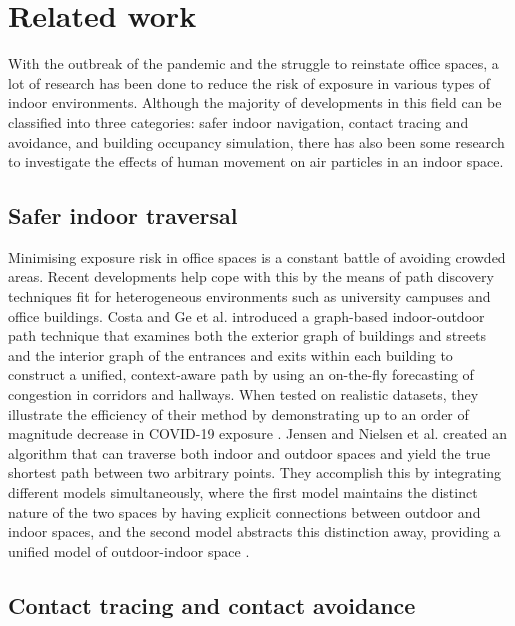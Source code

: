 \documentclass[acmtog]{acmart}
\begin{document}


\section{Related work}
With the outbreak of the pandemic and the struggle to reinstate office spaces, a lot of research has been done to reduce the risk of exposure in various types of indoor environments. Although the majority of developments in this field can be classified into three categories: safer indoor navigation, contact tracing and avoidance, and building occupancy simulation, there has also been some research to investigate the effects of human movement on air particles in an indoor space.

\subsection{Safer indoor traversal}

Minimising exposure risk in office spaces is a constant battle of avoiding crowded areas. Recent developments help cope with this by the means of path discovery techniques fit for heterogeneous environments such as university campuses and office buildings. Costa and Ge et al. introduced a graph-based indoor-outdoor path technique that examines both the exterior graph of buildings and streets and the interior graph of the entrances and exits within each building to construct a unified, context-aware path by using an on-the-fly forecasting of congestion in corridors and hallways. When tested on realistic datasets, they illustrate the efficiency of their method by demonstrating up to an order of magnitude decrease in COVID-19 exposure \cite{costa2019caprio}. Jensen and Nielsen et al. created an algorithm that can traverse both indoor and outdoor spaces and yield the true shortest path between two arbitrary points. They accomplish this by integrating different models simultaneously, where the first model maintains the distinct nature of the two spaces by having explicit connections between outdoor and indoor spaces, and the second model abstracts this distinction away, providing a unified model of outdoor-indoor space \cite{jensen2016outdoor}.

\subsection{Contact tracing and contact avoidance}
\end{document}
